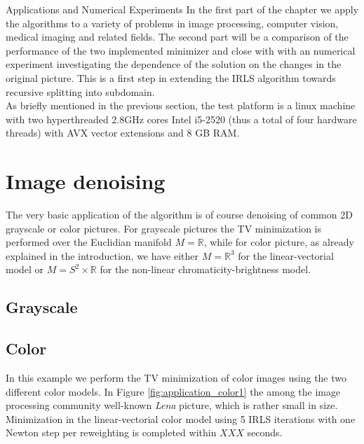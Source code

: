 \begin{chapter}{Applications and Numerical Experiments}
\label{ch:numericalexperiments}
In the first part of the chapter we apply the algorithms to a variety of problems in image processing, computer vision, medical imaging and related fields.
The second part will be a comparison of the performance of the two implemented minimizer and close with with an numerical experiment investigating the 
dependence of the solution on the changes in the original picture. This is a first step in extending the IRLS algorithm towards recursive splitting into subdomain.\\

As briefly mentioned in the previous section, the test platform is a linux machine with two hyperthreaded 2.8GHz cores Intel i5-2520 (thus a total of four hardware threads)
with AVX vector extensions and 8 GB RAM. 


\section{Image denoising} %
\label{sec:image denoising}
The very basic application of the algorithm is of course denoising of common 2D grayscale or color pictures.
For grayscale pictures the TV minimization is performed over the Euclidian manifold $M=\mathbb{R}$, while for color
picture, as already explained in the introduction, we have either $M=\mathbb{R}^3$ for the linear-vectorial model or
$M=S^2\times\mathbb{R}$ for the non-linear chromaticity-brightness model.

\subsection{Grayscale} %
\label{sub:Grayscale}

\FloatBarrier
\subsection{Color} %
\label{sub:Color}
In this example we perform the TV minimization of color images using the two different color models. In Figure \ref{fig:application_color1}
the among the image processing community well-known \emph{Lena} picture, which is rather small in size. Minimization in
the linear-vectorial color model using 5 IRLS iterations with one Newton step per reweighting is completed within $XXX$ seconds.\\


\end{chapter}
